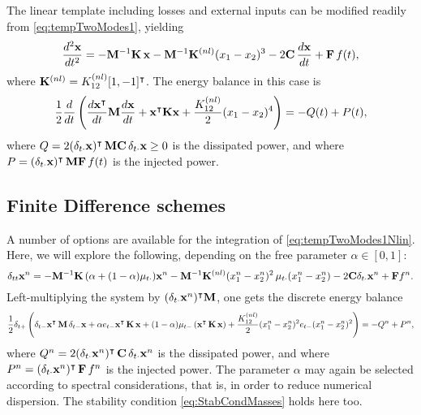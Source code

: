 \documentclass[11pt,twoside,a4paper,english]{book}
\newcommand{\etm}{e_{t-}}
\newcommand{\dtp}{\delta_{t+}}
\newcommand{\dtm}{\delta_{t-}}
\newcommand{\dtd}{\delta_{t\cdot}}
\newcommand{\dtt}{\delta_{tt}}
\newcommand{\mtm}{\mu_{t-}}
\newcommand{\mtd}{\mu_{t\cdot}}
\begin{document}
The linear template including losses and external inputs can be modified readily from \eqref{eq:tempTwoModes1}, yielding 
\begin{equation}\label{eq:tempTwoModes1Nlin}
\frac{d^2{\bf x}}{dt^2} = -{\bf M}^{-1}{\bf K} \, {\bf x}  - {\bf M}^{-1}{\bf K}^{(nl)}(x_1-x_2)^3 - 2 {\bf C} \, \frac{d{\bf x}}{dt} + {\bf F}\, f(t),
\end{equation}
where ${\bf K}^{(nl)} = K_{12}^{(nl)}[1,-1]^\intercal$. The energy balance in this case is
\begin{equation}
\frac{1}{2}\frac{d}{dt}\left(\frac{d{\bf x}^\intercal}{dt} {\bf M} \frac{d{\bf x}}{dt} + {\bf x}^\intercal {\bf K} {\bf x}+ \frac{K^{(nl)}_{12}}{2}(x_1-x_2)^4\right) = - Q(t) + P(t),
\end{equation}
where $Q = 2(\dtd {\bf x})^\intercal \,{\bf M}{\bf C} \, \dtd {\bf x} \geq 0$ is the dissipated power, and where $P = (\dtd {\bf x})^\intercal \, {\bf M}{\bf F} \, f(t)$ is the injected power.

\subsection{Finite Difference schemes}

A number of options are available for the integration of \eqref{eq:tempTwoModes1Nlin}. Here, we will explore the following, depending on the free parameter $\alpha \in [0,1]$:
\begin{equation}
\dtt {\bf x}^n = -{\bf M}^{-1}{\bf K}\, (\alpha + (1-\alpha)\mtd) {\bf x}^n - {\bf M}^{-1}{\bf K}^{(nl)}(x^n_1-x^n_2)^2\, \mtd(x^n_1-x^n_2)- 2{\bf C}\dtd {\bf x}^n + {\bf F} f^n.
\end{equation}
Left-multiplying the system by $(\dtd {\bf x}^n)^\intercal{\bf M}$, one gets the discrete energy balance
\begin{equation}
\frac{1}{2}\dtp \left( \dtm {\bf x}^{\intercal}\,{\bf M}\, \dtm {\bf x} + \alpha \etm {\bf x}^{\intercal}\,{\bf K}\,  {\bf x} + (1-\alpha) \mtm \left({\bf x}^{\intercal}\,{\bf K}\,  {\bf x}\right) + \frac{K^{(nl)}_{12}}{2}{(x^n_1-x^n_2)^2\etm(x^n_1-x^n_2)^2}  \right)   = -Q^n+P^n,
\end{equation}
where $Q^n = 2(\dtd {\bf x}^n)^\intercal \, {\bf C} \, \dtd {\bf x}^n$ is the dissipated power, and where $P^n = ({\dtd {\bf x}^n})^\intercal \, {\bf F} \, f^n$ is the injected power. The parameter $\alpha$ may again be selected according to spectral considerations, that is, in order to reduce numerical dispersion. The stability condition \eqref{eq:StabCondMasses} holds here too. 
\end{document}
